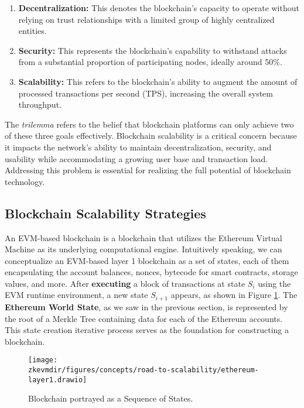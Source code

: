 \begin{enumerate}

\item \textbf{Decentralization:} This denotes the blockchain's capacity to operate without relying on trust relationships with a limited group of highly centralized entities.

\item \textbf{Security:} This represents the blockchain's capability to withstand attacks from a substantial proportion of participating nodes, ideally around 50\%.

\item \textbf{Scalability:} This refers to the blockchain's ability to augment the amount of processed transactions per second (TPS), increasing the overall system throughput.

\end{enumerate}

The \textit{trilemma} refers to the belief that blockchain platforms can only achieve two of these three goals effectively. Blockchain scalability is a critical concern because it impacts the network's ability to maintain decentralization, security, and usability while accommodating a growing user base and transaction load. Addressing this problem is essential for realizing the full potential of blockchain technology.

\subsection{Blockchain Scalability Strategies}

An EVM-based blockchain is a blockchain that utilizes the Ethereum Virtual Machine as its underlying computational engine. Intuitively speaking, we can conceptualize an EVM-based layer 1 blockchain as a set of states, each of them encapsulating the account balances, nonces, bytecode for smart contracts, storage values, and more. After \textbf{executing} a block of transactions at state $S_i$ using the EVM runtime environment, a new state $S_{i+1}$ appears, as shown in Figure \ref{fig:state-sequence}. The  \textbf{Ethereum World State}, as we saw in the previous section, is represented by the root of a Merkle Tree containing data for each of the Ethereum accounts. This state creation iterative process serves as the foundation for constructing a blockchain.

\begin{figure}[H]
\centering
\texttt{[image: \\zkevmdir/figures/concepts/road-to-scalability/ethereum-layer1.drawio]}
\caption{Blockchain portrayed as a Sequence of States. }
\label{fig:state-sequence}
\end{figure}

